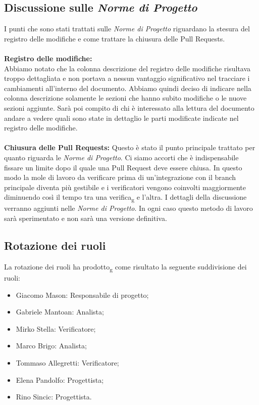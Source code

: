 \subsection{Discussione sulle \textit{Norme di Progetto}}
 I punti che sono stati trattati sulle \textit{Norme di Progetto} riguardano la stesura del registro delle modifiche e come trattare la chiusura delle Pull Requests.
\\\\
\textbf{Registro delle modifiche:}
\\
Abbiamo notato che la colonna descrizione del registro delle modifiche risultava troppo dettagliata e non portava a nessun vantaggio significativo nel tracciare i cambiamenti all'interno del documento.
Abbiamo quindi deciso di indicare nella colonna descrizione solamente le sezioni che hanno subito modifiche o le nuove sezioni aggiunte.
Sarà poi compito di chi è interessato alla lettura del documento andare a vedere quali sono state in dettaglio le parti modificate indicate nel registro delle modifiche.
\\\\
\textbf{Chiusura delle Pull Requests:}
Questo è stato il punto principale trattato per quanto riguarda le \textit{Norme di Progetto}.
Ci siamo accorti che è indispensabile fissare un limite dopo il quale una Pull Request deve essere chiusa.
In questo modo la mole di lavoro da verificare prima di un'integrazione con il branch principale diventa più gestibile e i verificatori vengono coinvolti maggiormente
diminuendo così il tempo tra una verifica\textsubscript{g} e l'altra.
I dettagli della discussione verranno aggiunti nelle \textit{Norme di Progetto}. In ogni caso questo metodo di lavoro sarà sperimentato e non sarà una versione definitiva.
\\
\subsection{Rotazione dei ruoli}
La rotazione dei ruoli ha prodotto\textsubscript{g} come risultato la seguente suddivisione dei ruoli:
\begin{itemize}
    \item Giacomo Mason: Responsabile di progetto;
	\item Gabriele Mantoan: Analista;
	\item Mirko Stella: Verificatore;
	\item Marco Brigo: Analista;
	\item Tommaso Allegretti: Verificatore;
	\item Elena Pandolfo: Progettista;
	\item Rino Sincic: Progettista.
\end{itemize}
